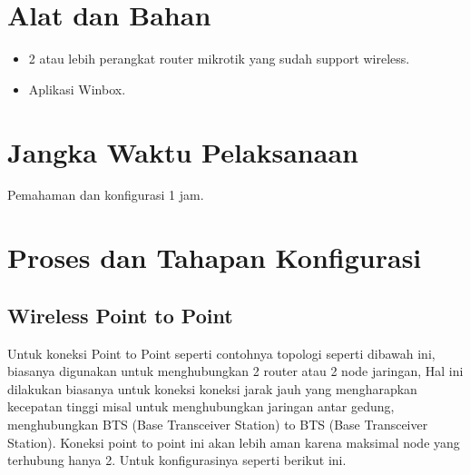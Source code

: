 \section{Alat dan Bahan}
\begin{itemize}[label=$\bullet$, itemsep=-1pt, leftmargin=*]
	\item 2 atau lebih perangkat router mikrotik yang sudah support wireless.
	\item Aplikasi Winbox.
\end{itemize}

\section{Jangka Waktu Pelaksanaan}
Pemahaman dan konfigurasi 1 jam.

\section{Proses dan Tahapan Konfigurasi}
\subsection{Wireless Point to Point}
Untuk koneksi Point to Point seperti contohnya topologi seperti dibawah ini, biasanya
digunakan untuk menghubungkan 2 router atau 2 node jaringan, Hal ini dilakukan biasanya
untuk koneksi koneksi jarak jauh yang mengharapkan kecepatan tinggi misal untuk
menghubungkan jaringan antar gedung, menghubungkan BTS (Base Transceiver Station) to
BTS (Base Transceiver Station). Koneksi point to point ini akan lebih aman karena maksimal
node yang terhubung hanya 2. Untuk konfigurasinya seperti berikut ini.

